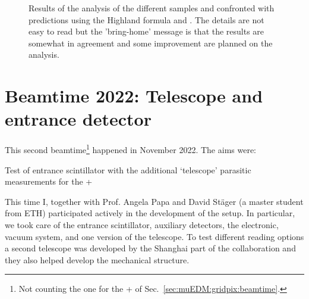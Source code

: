 \begin{refsection}
    \begin{figure}   
            \centering
            \hfill
            \caption{Results of the analysis of the different samples and confronted with predictions using the Highland formula and \gf. The details are not easy to read but the 'bring-home' message is that the results are somewhat in agreement and some improvement are planned on the analysis.}
            \label{fig:muEDM:bt2021:results}
        \end{figure}

\section{Beamtime 2022: Telescope and entrance detector}
\label{sec:muEDM:beamtime2022}
    This second beamtime\footnote{Not counting the one for the \tpc + \grid of Sec.~\ref{sec:muEDM:gridpix:beamtime}.} happened in November 2022.
    The aims were:
    \begin{outline}
        \1 Test of entrance scintillator with the additional `telescope'
        \1 parasitic measurements for the \tpc+ \grid
    \end{outline}
    This time I, together with Prof. Angela Papa and David St\"{a}ger (a master student from ETH) participated actively in the development of the setup. 
    In particular, we took care of the entrance scintillator, auxiliary detectors, the electronic, vacuum system, and one version of the telescope. 
    To test different reading options a second telescope was developed by the Shanghai part of the collaboration and they also helped develop the mechanical structure.


\end{refsection}

